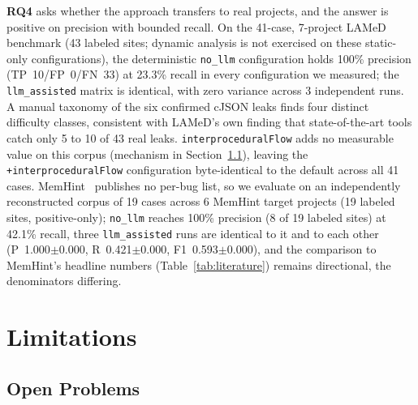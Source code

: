 \documentclass[a4paper]{llncs}
\begin{document}
\textbf{RQ4} asks whether the approach transfers to real projects, and
the answer is positive on precision with bounded recall. On the 41-case,
7-project LAMeD benchmark (43 labeled sites; dynamic
analysis is not exercised on these static-only configurations), the
deterministic \texttt{no\_llm} configuration holds 100\% precision
(TP~10/FP~0/FN~33) at 23.3\% recall in every configuration we measured;
the \texttt{llm\_assisted} matrix is identical, with zero
variance across 3 independent runs. A manual taxonomy of the six
confirmed cJSON leaks finds four distinct difficulty
classes, consistent with LAMeD's own finding that
state-of-the-art tools catch only 5 to 10 of 43 real leaks.
\texttt{interproceduralFlow} adds no measurable value on this corpus
(mechanism in Section~\ref{sec:openproblems}), leaving the
\texttt{+interproceduralFlow} configuration byte-identical
to the default across all 41 cases. MemHint~\cite{memhint} publishes no
per-bug list, so we evaluate on an independently reconstructed
corpus of 19 cases across 6 MemHint target projects (19 labeled
sites,
positive-only); \texttt{no\_llm} reaches 100\% precision (8 of 19
labeled sites) at 42.1\% recall, three \texttt{llm\_assisted} runs
are identical to it and to each other (P~1.000$\pm$0.000,
R~0.421$\pm$0.000, F1~0.593$\pm$0.000), and the comparison to MemHint's
headline numbers (Table~\ref{tab:literature}) remains directional,
the denominators differing.

\noindent{}

\section{Limitations}
\label{sec:discussion}

\subsection{Open Problems}
\label{sec:openproblems}
\end{document}
